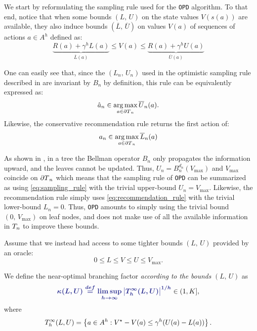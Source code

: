 \documentclass[runningheads]{llncs}
\begin{document}
We start by reformulating the sampling rule used for the \texttt{OPD} algorithm. To that end, notice that when some bounds $(L,\,U)$ on the state values $V(s(a))$ are available, they also induce bounds $(\overline{L},\, \overline{U})$ on values $V(a)$ of sequences of actions $a\in A^h$ defined as:
\begin{equation*}
\underbrace{R(a) + \gamma^{h} L(a)}_{\overline{L}(a)} \leq V(a) \leq \underbrace{R(a) + \gamma^{h} U(a)}_{\overline{U}(a)}
\end{equation*}


One can easily see that, since the $(L_n,\,U_n)$ used in the optimistic sampling rule described in  are invariant by $B_n$ by definition, this rule can be equivalently expressed as:
\begin{equation}
\label{eq:sampling_rule}
\hat{a}_n \in \operatorname*{arg\,max}_{a\in{\partial T}_n} \overline{U}_n(a).
\end{equation}
Likewise, the conservative recommendation rule returns the first action of:
\begin{equation}
\label{eq:recommendation_rule}
a_n \in \operatorname*{arg\,max}_{a\in{\partial T}_n} \overline{L}_n(a)
\end{equation}


As shown in , in a tree the Bellman operator $B_n$ only propagates the information upward, and the leaves cannot be updated. Thus, $U_n = B_n^{d_n}(V_{\max})$ and $V_{\max}$ coincide on ${\partial T}_n$ which means that the sampling rule of \texttt{OPD} can be summarized as using \eqref{eq:sampling_rule} with the trivial upper-bound $U_n = V_{\max}$.
Likewise, the recommendation rule simply uses \eqref{eq:recommendation_rule} with the trivial lower-bound $L_n = 0$. Thus, \texttt{OPD} amounts to simply using the trivial bound $(0,\, V_{\max})$ on leaf nodes, and does not make use of all the available information in $T_n$ to improve these bounds.

Assume that we instead had access to some tighter bounds $(L,\,U)$ provided by an oracle: $$0\leq L\leq V\leq U\leq V_{\max}.$$
\begin{definition}
We define the near-optimal branching factor \emph{according to the bounds $(L,\,U)$} as 
\begin{equation}
\hlbb{\kappa(L,U) \eqdef \limsup_{h\rightarrow\infty} \left|\Tau_h^\infty(L,U)\right|^{1/h}}\in(1, K], 
\end{equation}
where
\begin{equation*}
     {T_h^\infty(L,U)}=\left\{a\in A^h: V^\star - V(a)\leq \gamma^{h}(U(a)-L(a))\right\}.
\end{equation*}
\end{definition}
\end{document}
